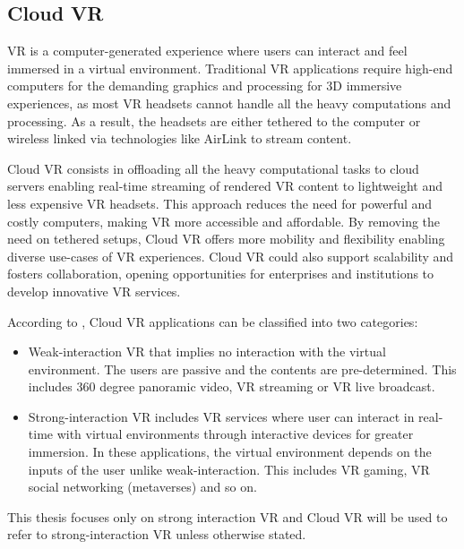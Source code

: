 


\subsection{Cloud VR}
\ac{VR} is a computer-generated experience where users can interact and feel immersed in a virtual environment. Traditional VR applications require high-end computers for the demanding graphics and processing for 3D immersive experiences, as most VR headsets cannot handle all the heavy computations and processing. As a result, the headsets are either tethered to the computer or wireless linked via technologies like AirLink to stream content.

Cloud \ac{VR} consists in offloading all the heavy computational tasks to cloud servers enabling real-time streaming of rendered VR content to lightweight and less expensive VR headsets. This approach reduces the need for powerful and costly computers, making VR more accessible and affordable. By removing the need on tethered setups, Cloud VR offers more mobility and flexibility enabling diverse use-cases of VR experiences. Cloud VR could also support scalability and fosters collaboration, opening opportunities for enterprises and institutions to develop innovative VR services.

According to \cite{huawei}, Cloud VR applications can be classified into two categories:
\begin{itemize}
    \item Weak-interaction VR that implies no interaction with the virtual environment. The users are passive and the contents are pre-determined. This includes 360 degree panoramic video, VR streaming or VR live broadcast.
    \item Strong-interaction VR includes VR services where user can interact in real-time with virtual environments through interactive devices for greater immersion. In these applications, the virtual environment depends on the inputs of the user unlike weak-interaction. This includes VR gaming, VR social networking (metaverses) and so on.
\end{itemize}
This thesis focuses only on strong interaction VR and Cloud VR will be used to refer to strong-interaction VR unless otherwise stated. 


